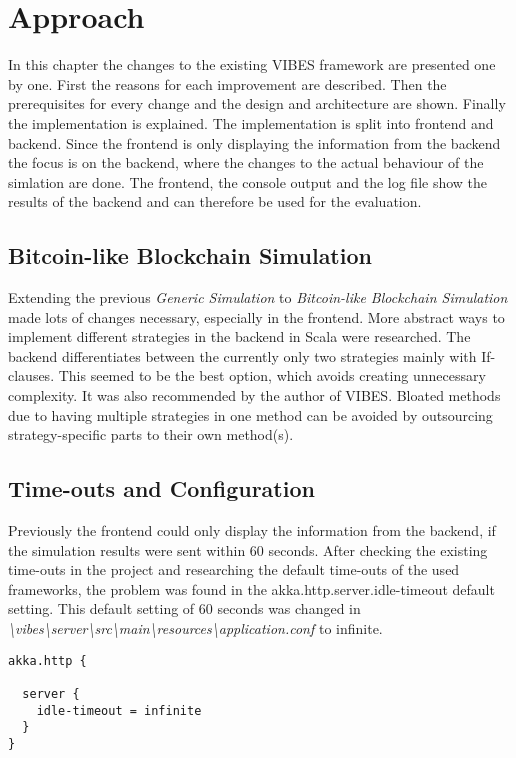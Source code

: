 \chapter{Approach}\label{chapter:approach}
In this chapter the changes to the existing VIBES framework are presented one by one. First the reasons for each improvement are described. Then the prerequisites for every change and the design and architecture are shown. Finally the implementation is explained. The implementation is split into frontend and backend. Since the frontend is only displaying the information from the backend the focus is on the backend, where the changes to the actual behaviour of the simlation are done. The frontend, the console output and the log file show the results of the backend and can therefore be used for the evaluation.

\section{Bitcoin-like Blockchain Simulation}
Extending the previous \textit{Generic Simulation} to \textit{Bitcoin-like Blockchain Simulation} made lots of changes necessary, especially in the frontend. More abstract ways to implement different strategies in the backend in Scala were researched. The backend differentiates between the currently only two strategies mainly with If-clauses. This seemed to be the best option, which avoids creating unnecessary complexity. It was also recommended by the author of VIBES. Bloated methods due to having multiple strategies in one method can be avoided by outsourcing strategy-specific parts to their own method(s).

\section{Time-outs and Configuration}
Previously the frontend could only display the information from the backend, if the simulation results were sent within 60 seconds. After checking the existing time-outs in the project and researching the default time-outs of the used frameworks, the problem was found in the akka.http.server.idle-timeout default setting. This default setting of 60 seconds was changed in \textit{\textbackslash vibes\textbackslash server\textbackslash src\textbackslash main\textbackslash resources\textbackslash application.conf} to infinite.

\begin{minipage}{\linewidth}
\begin{lstlisting}[style=myScalastyle,label=lst:akkahttp,caption={application.conf}]
akka.http {

  server {
    idle-timeout = infinite
  }
}
\end{lstlisting}
\end{minipage}

